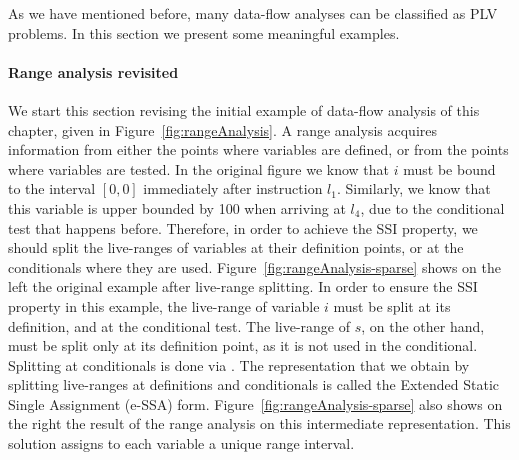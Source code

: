 {As we have mentioned before, many data-flow analyses can be classified as PLV problems.
In this section we present some meaningful examples.

\paragraph{Range analysis revisited}
We start this section revising the initial example of data-flow analysis of 
this chapter, given in Figure~\ref{fig:rangeAnalysis}.
A range analysis acquires information from either the points where variables are defined, or from the points where variables are tested.
In the original figure we know that $i$ must be bound to the interval $[0, 0]$ 
immediately after instruction $l_1$.
Similarly, we know that this variable is upper bounded by 100 when arriving at 
$l_4$, due to the conditional test that happens before.
Therefore, in order to achieve the SSI property, we should split the live-ranges of variables at their definition points, or at the conditionals where they are used.
Figure~\ref{fig:rangeAnalysis-sparse} shows on the left the original example 
after live-range splitting.
In order to ensure the SSI property in this example, the live-range of variable $i$ must be split at its definition, and at the conditional test.
The live-range of $s$, on the other hand, must be split only at its definition point, as it is not used in the conditional.
Splitting at conditionals is done via \sigmafuns.
The representation that we obtain by splitting live-ranges at definitions and conditionals is called the Extended Static Single Assignment (e-SSA) form.
Figure~\ref{fig:rangeAnalysis-sparse} also shows on the right the result of the 
range analysis on this intermediate representation.
This solution assigns to each variable a unique range interval.

\begin{figure}[t!]
\hfill
\hfill
\centerheight{
    $\begin{array}[b]{ll}
      [i_1] = [i_1] \cup [0,0] &= [0,0]\\

      [s_1] = [s_1] \cup [0,0] &= [0,0]\\

      [i_2] = [i_2] \cup [i_1] \cup [i_4] &= [0,100]\\

      [s_2] = [s_2] \cup [s_1] \cup [s_3] &= [0,+\infty[\\


\end{array}}
\end{figure}}
